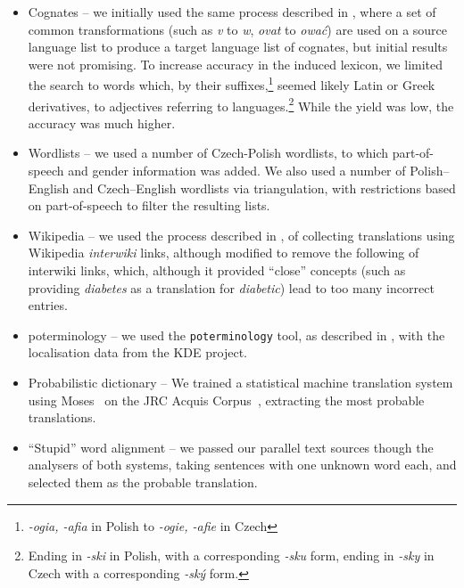 \documentclass[11pt]{article}
\begin{document}
\begin{itemize}
\item Cognates -- we initially used the same process described in \cite{tyers2009rfr},
where a set of common transformations (such as \textit{v} to \textit{w}, \textit{ovat} 
to \textit{ować}) are used on a source language list to produce a target language
list of cognates, 
but initial results were not promising. To increase accuracy in the induced lexicon,
we limited the search to words which, by their 
suffixes,\footnote{\emph{-ogia, -afia} in Polish to \emph{-ogie, -afie} in Czech}
seemed likely Latin or Greek derivatives, to adjectives referring to 
languages.\footnote{Ending in \emph{-ski} in Polish, with a corresponding \emph{-sku} form,
ending in \emph{-sky} in Czech with a corresponding \emph{-ský} form.} While the
yield was low, the accuracy was much higher.

\item Wordlists -- we used a number of Czech-Polish wordlists, to which part-of-speech 
and gender information was added. We also used a number of Polish--English and Czech--English
wordlists via triangulation, with restrictions based on part-of-speech to filter the
resulting lists.

\item Wikipedia -- we used the process described in \cite{tyers2008}, 
of collecting translations using Wikipedia \textit{interwiki} links, although modified to
remove the following of interwiki links, which, although it provided ``close'' concepts
(such as providing \emph{diabetes} as a translation for \emph{diabetic}) lead to too
many incorrect entries.

\item poterminology -- we used the {\tt\small poterminology} tool, as described in
\cite{unhammer2009rfr}, with the localisation data from the KDE project.%

\item Probabilistic dictionary -- We trained a statistical machine translation system
using Moses~\citep{Koehn2007} on the JRC Acquis Corpus~\citep{Steinberger2006},
extracting the most probable translations.%

\item ``Stupid'' word alignment -- we passed our parallel text sources though the
analysers of both systems, taking sentences with one unknown word each, and selected
them as the probable translation.%
\end{itemize}
\end{document}
